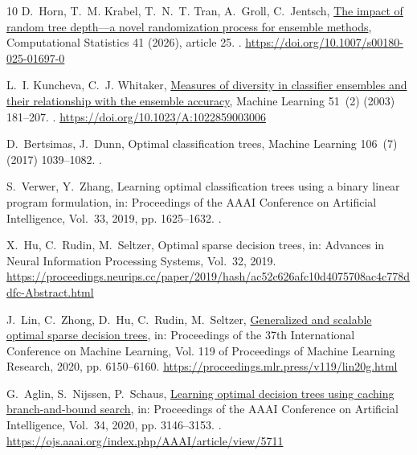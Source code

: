 \documentclass[final,5p,times]{elsarticle}
\begin{document}
\begin{thebibliography}{10}
D.~Horn, T.~M. Krabel, T.~N.~T. Tran, A.~Groll, C.~Jentsch,
  \href{https://doi.org/10.1007/s00180-025-01697-0}{The impact of random tree
  depth---a novel randomization process for ensemble methods}, Computational
  Statistics 41 (2026), article 25.
\newblock \href {https://doi.org/10.1007/s00180-025-01697-0}
  {}.
\newline\urlprefix\url{https://doi.org/10.1007/s00180-025-01697-0}

L.~I. Kuncheva, C.~J. Whitaker,
  \href{https://doi.org/10.1023/A:1022859003006}{Measures of diversity in
  classifier ensembles and their relationship with the ensemble accuracy},
  Machine Learning 51~(2) (2003) 181--207.
\newblock \href {https://doi.org/10.1023/A:1022859003006}
  {}.
\newline\urlprefix\url{https://doi.org/10.1023/A:1022859003006}

D.~Bertsimas, J.~Dunn, Optimal classification trees, Machine Learning 106~(7)
  (2017) 1039--1082.
\newblock \href {https://doi.org/10.1007/s10994-017-5633-9}
  {}.

S.~Verwer, Y.~Zhang, Learning optimal classification trees using a binary
  linear program formulation, in: Proceedings of the AAAI Conference on
  Artificial Intelligence, Vol.~33, 2019, pp. 1625--1632.
\newblock \href {https://doi.org/10.1609/aaai.v33i01.33011624}
  {}.

X.~Hu, C.~Rudin, M.~Seltzer, Optimal sparse decision trees, in: Advances in
  Neural Information Processing Systems, Vol.~32, 2019.
\newline\urlprefix\url{https://proceedings.neurips.cc/paper/2019/hash/ac52c626afc10d4075708ac4c778ddfc-Abstract.html}

J.~Lin, C.~Zhong, D.~Hu, C.~Rudin, M.~Seltzer,
  \href{https://proceedings.mlr.press/v119/lin20g.html}{Generalized and
  scalable optimal sparse decision trees}, in: Proceedings of the 37th
  International Conference on Machine Learning, Vol. 119 of Proceedings of
  Machine Learning Research, 2020, pp. 6150--6160.
\newline\urlprefix\url{https://proceedings.mlr.press/v119/lin20g.html}

G.~Aglin, S.~Nijssen, P.~Schaus,
  \href{https://ojs.aaai.org/index.php/AAAI/article/view/5711}{Learning optimal
  decision trees using caching branch-and-bound search}, in: Proceedings of the
  AAAI Conference on Artificial Intelligence, Vol.~34, 2020, pp. 3146--3153.
\newblock \href {https://doi.org/10.1609/aaai.v34i04.5711}
  {}.
\newline\urlprefix\url{https://ojs.aaai.org/index.php/AAAI/article/view/5711}


\end{thebibliography}
\end{document}
